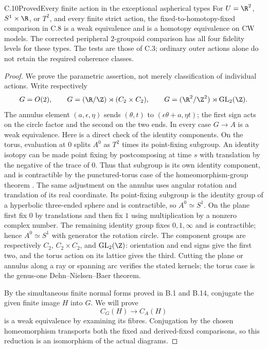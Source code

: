 \begin{claim}{C.10}{Proved}{Every finite action in the exceptional aspherical types}
For $U=\R^2$, $S^1\times\R$, or $T^2$, and every finite strict action,
the fixed-to-homotopy-fixed comparison in C.8 is a weak equivalence
and is a homotopy equivalence on CW models. The corrected peripheral
$2$-groupoid comparison has all four fidelity levels for these types.
The tests are those of C.3; ordinary outer actions alone do not retain
the required coherence classes.
\end{claim}
\begin{proof}
We prove the parametric assertion, not merely classification of individual
actions. Write respectively
\[
 G=O(2),\qquad
 G=(\R/\Z)\rtimes(C_2\times C_2),\qquad
 G=(\R^2/\Z^2)\rtimes\operatorname{GL}_2(\Z).
\]
The annulus element $(a,\epsilon,\eta)$ sends
$(\theta,t)$ to $(\epsilon\theta+a,\eta t)$; the first sign acts on the
circle factor and the second on the two ends. In every case $G\to A$
is a weak equivalence. Here is a direct check of the identity components.
On the torus, evaluation at $0$ splits $A^0$ as $T^2$ times its
point-fixing subgroup. An identity isotopy can be made point fixing by
postcomposing at time $s$ with translation by the negative of the trace
of $0$. Thus that subgroup is its own identity component, and is
contractible by the punctured-torus case of the homeomorphism-group
theorem \cite[Theorem 1.1 and Lemma 2.1]{C_Yagasaki2000}. The same adjustment on the annulus uses angular rotation and
translation of its real coordinate. Its point-fixing subgroup is the
identity group of a hyperbolic three-ended sphere and is contractible,
so $A^0\simeq S^1$. On the plane first fix $0$ by translations and
then fix $1$ using multiplication by a nonzero complex number. The
remaining identity group fixes $0,1,\infty$ and is contractible; hence
$A^0\simeq S^1$ with generator the rotation circle. The component
groups are respectively $C_2$, $C_2\times C_2$, and
$\operatorname{GL}_2(\Z)$: orientation and end signs give the first
two, and the torus action on its lattice gives the third. Cutting the
plane or annulus along a ray or spanning arc verifies the stated
kernels; the torus case is the genus-one Dehn--Nielsen--Baer theorem.

By the simultaneous finite normal forms proved in B.1 and B.14,
conjugate the given finite image $H$ into $G$. We will prove
\[
                    C_G(H)\longrightarrow C_A(H)                 \tag{C.10.1}
\]
is a weak equivalence by examining its fibres. Conjugation by the chosen
homeomorphism transports both the fixed and derived-fixed comparisons,
so this reduction is an isomorphism of the actual diagrams.


\end{proof}

